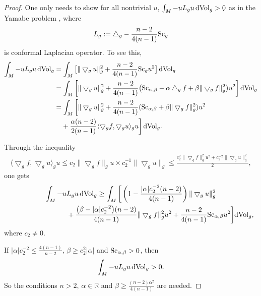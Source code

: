 \documentclass[10pt,a4paper]{amsart}
\begin{document}
\begin{proof}One only needs to show for all nontrivial $u$, $\int_M - u L_gu \,{\rm dVol}_g > 0$ as in the Yamabe problem \cite{MR788292}, where
\begin{align*}
L_g: = \bigtriangleup_g - \frac{n-2}{4(n-1)}{\rm Sc}_g
\end{align*}
 is conformal Laplacian operator. To see this,
\begin{align*}
\int_M - u L_gu \,{\rm dVol}_g &= \int_M \big[ \|\bigtriangledown_gu\|_g^2 + \frac{n-2}{4(n-1)}{\rm Sc}_g u^2 \big] \,{\rm dVol}_g \\
& = \int_M \left[ \|\bigtriangledown_gu\|_g^2 + \frac{n-2}{4(n-1)}\big({\rm Sc}_{\alpha, \beta} - \alpha \bigtriangleup_gf + \beta\|\bigtriangledown_gf\|^2_g\big) u^2\right] {\rm dVol}_g \\
& = \int_M \left[ \|\bigtriangledown_gu\|_g^2 + \frac{n-2}{4(n-1)}({\rm Sc}_{\alpha, \beta} + \beta\|\bigtriangledown_gf\|^2_g)u^2\right.\\
&\left. \hphantom{=}{} + \frac{\alpha(n-2)}{2(n-1)} \langle\bigtriangledown_gf,\bigtriangledown_gu \rangle_g u \right] {\rm dVol}_g.
\end{align*}

Through the inequality
\begin{gather*}
 \langle\bigtriangledown_gf,\bigtriangledown_gu \rangle_g u \leq c_2 \|\bigtriangledown_gf\|_gu \times c_2^{-1} \|\bigtriangledown_gu\|_g \leq \frac{c_2^2 \|\bigtriangledown_gf\|_g^2 u^2 + c_2^{-2}\|\bigtriangledown_gu\|_g^2}{2},
\end{gather*}
one gets
\begin{gather*}
\int_M - u L_gu \,{\rm dVol}_g \geq
 \int_M \bigg[ \left(1- \frac{|\alpha|c_2^{-2}(n-2)}{4(n-1)}\right)\|\bigtriangledown_gu\|_g^2 \\
\hphantom{\int_M - u L_gu \,{\rm dVol}_g \geq}{}
+\frac{\big(\beta -|\alpha|c_2^{-2}\big)(n-2)}{4(n-1)}\|\bigtriangledown_gf\|_g^2u^2+ \frac{n-2}{4(n-1)}{\rm Sc}_{\alpha, \beta}u^2\bigg]{\rm dVol}_g,
\end{gather*}
where $c_2 \neq 0$.

If $ |\alpha|c_2^{-2} \leq \frac{4(n-1)}{n-2}$, $\beta \geq c_2^2|\alpha|$ and ${\rm Sc}_{\alpha, \beta}> 0$, then
\begin{align*}
 \int_M - u L_gu\, {\rm dVol}_g >0.
\end{align*}
 So the conditions $n>2$, $\alpha \in \mathbb{R}$ and $\beta \geq \frac{(n-2)\alpha^2}{4(n-1)}$ are needed.
\end{proof}
\end{document}
